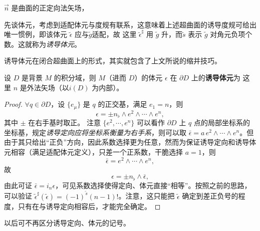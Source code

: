 $\vec n$ 是曲面的正定向法矢场，


先谈体元，考虑到适配体元与度规有联系，这意味着上述超曲面的诱导度规可给出唯一惯例，即该体元 $\tilde\epsilon$ 应与$\tilde g$适配，故
这里 $\tilde\epsilon^\sharp$ 用 $\tilde g$ 升，而$\tilde s$ 表示 $\tilde g$ 对角元负项个数。这就称为\textit{诱导体元}。

诱导体元在闭合超曲面上的形式，其实就包含了上文所说的缩并技巧。

\begin{theorem}
    设 $D$ 是背景 $M$ 的积分域，则 $M$（进而 $D$）的体元 $\epsilon$ 在 $\partial D$ 上的\textbf{诱导体元}为
    这里 $n$ 是外法矢场（以$i(D)$ 为内部）。
\end{theorem}
\begin{proof}
    $\forall q\in\partial D$，设 $\{e_\mu\}$ 是 $q$ 的正交基，满足 $e_1=n$，则
    \[
    \epsilon=\pm n_\flat\wedge e^2\wedge\cdots\wedge e^n,
    \]
    其中 $\pm$ 在右手基时取正。
    注意 $\{e^2,\cdots, e^n\}$ 可以看作 $\partial D$ 上 $q$ 点的局部坐标系的坐标基，规定\textit{诱导定向应将坐标系衡量为右手系}，则可以取 $\bar\epsilon=a\,e^2\wedge\cdots\wedge e^n$。但由于其只给出“正负”方向，因此系数选择更为任意，然而为保证诱导定向和诱导体元相容（满足适配体元定义），只差一个正系数，干脆选择 $a=1$，则
    \[
    \bar\epsilon=e^2\wedge\cdots\wedge e^n,
    \]
    故
    \[
    \epsilon=\pm n_\flat\wedge \bar\epsilon,
    \]
    由此可证 $\bar\epsilon=i_n\epsilon$，可见系数选择使得定向、体元直接“相等”。按照之前的思路，可以验证 $\tilde\epsilon^\sharp(\tilde\epsilon)=(-1)^{\tilde s}(n-1)!$。注意，这只能把 $\tilde\epsilon$ 确定到差正负号的程度，只有在与诱导定向相容后，才能完全确定。
\end{proof}
以后可不再区分诱导定向、体元的记号。

